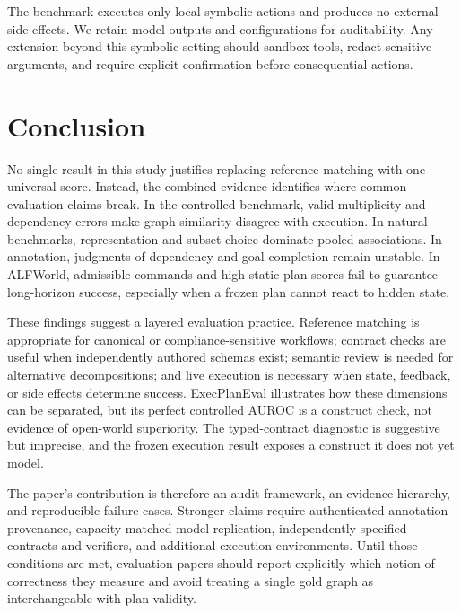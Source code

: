 \documentclass[10pt]{article}
\begin{document}
The benchmark executes only local symbolic actions and produces no external
side effects. We retain model outputs and configurations for auditability. Any
extension beyond this symbolic setting should sandbox tools, redact sensitive
arguments, and require explicit confirmation before consequential actions.

\section{Conclusion}
No single result in this study justifies replacing reference matching with one
universal score. Instead, the combined evidence identifies where common
evaluation claims break. In the controlled benchmark, valid multiplicity and
dependency errors make graph similarity disagree with execution. In natural
benchmarks, representation and subset choice dominate pooled associations. In
annotation, judgments of dependency and goal completion remain unstable. In
ALFWorld, admissible commands and high static plan scores fail to guarantee
long-horizon success, especially when a frozen plan cannot react to hidden
state.

These findings suggest a layered evaluation practice. Reference matching is
appropriate for canonical or compliance-sensitive workflows; contract checks
are useful when independently authored schemas exist; semantic review is
needed for alternative decompositions; and live execution is necessary when
state, feedback, or side effects determine success. ExecPlanEval illustrates
how these dimensions can be separated, but its perfect controlled AUROC is a
construct check, not evidence of open-world superiority. The typed-contract
diagnostic is suggestive but imprecise, and the frozen execution result exposes
a construct it does not yet model.

The paper's contribution is therefore an audit framework, an evidence
hierarchy, and reproducible failure cases. Stronger claims require authenticated
annotation provenance, capacity-matched model replication, independently
specified contracts and verifiers, and additional execution environments.
Until those conditions are met, evaluation papers should report explicitly
which notion of correctness they measure and avoid treating a single gold graph
as interchangeable with plan validity.

\appendix
\end{document}
